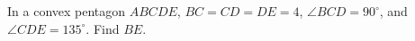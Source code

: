 In a convex pentagon $ABCDE$, $BC=CD=DE=4$, $\angle BCD=90^\circ$, and $\angle CDE=135^\circ$. Find $BE$.
